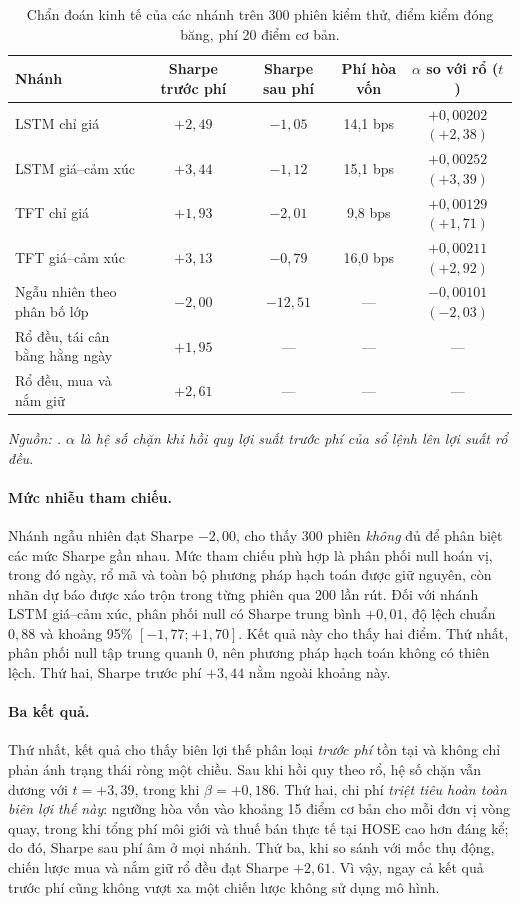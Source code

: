 \documentclass[12pt, a4paper, oneside]{report}
\begin{document}
\begin{table}[H]
  \centering
  \caption{Chẩn đoán kinh tế của các nhánh trên 300 phiên kiểm thử, điểm kiểm đóng băng, phí 20 điểm cơ bản.}
  \label{tab:kq-backtest}
  \begin{tabular}{l c c c c}
    \toprule
    Nhánh & Sharpe trước phí & Sharpe sau phí & Phí hòa vốn & $\alpha$ so với rổ ($t$) \\
    \midrule
    LSTM chỉ giá & $+2{,}49$ & $-1{,}05$ & 14,1 bps & $+0{,}00202$ $(+2{,}38)$ \\
    LSTM giá--cảm xúc & $+3{,}44$ & $-1{,}12$ & 15,1 bps & $+0{,}00252$ $(+3{,}39)$ \\
    TFT chỉ giá & $+1{,}93$ & $-2{,}01$ & 9,8 bps & $+0{,}00129$ $(+1{,}71)$ \\
    TFT giá--cảm xúc & $+3{,}13$ & $-0{,}79$ & 16,0 bps & $+0{,}00211$ $(+2{,}92)$ \\
    Ngẫu nhiên theo phân bố lớp & $-2{,}00$ & $-12{,}51$ & --- & $-0{,}00101$ $(-2{,}03)$ \\
    \midrule
    Rổ đều, tái cân bằng hằng ngày & $+1{,}95$ & --- & --- & --- \\
    Rổ đều, mua và nắm giữ & $+2{,}61$ & --- & --- & --- \\
    \bottomrule
  \end{tabular}
\noindent\textit{Nguồn: . $\alpha$ là hệ số chặn khi hồi quy lợi suất trước phí của sổ lệnh lên lợi suất rổ đều.}
\end{table}

\paragraph{Mức nhiễu tham chiếu.}
Nhánh ngẫu nhiên đạt Sharpe $-2{,}00$, cho thấy 300 phiên \emph{không} đủ để phân biệt các mức Sharpe gần nhau. Mức tham chiếu phù hợp là phân phối null hoán vị, trong đó ngày, rổ mã và toàn bộ phương pháp hạch toán được giữ nguyên, còn nhãn dự báo được xáo trộn trong từng phiên qua 200 lần rút. Đối với nhánh LSTM giá--cảm xúc, phân phối null có Sharpe trung bình $+0{,}01$, độ lệch chuẩn $0{,}88$ và khoảng 95\% $[-1{,}77; +1{,}70]$. Kết quả này cho thấy hai điểm. Thứ nhất, phân phối null tập trung quanh 0, nên phương pháp hạch toán không có thiên lệch. Thứ hai, Sharpe trước phí $+3{,}44$ nằm ngoài khoảng này.

\paragraph{Ba kết quả.}
Thứ nhất, kết quả cho thấy biên lợi thế phân loại \emph{trước phí} tồn tại và không chỉ phản ánh trạng thái ròng một chiều. Sau khi hồi quy theo rổ, hệ số chặn vẫn dương với $t = +3{,}39$, trong khi $\beta = +0{,}186$. Thứ hai, chi phí \emph{triệt tiêu hoàn toàn biên lợi thế này}: ngưỡng hòa vốn vào khoảng 15 điểm cơ bản cho mỗi đơn vị vòng quay, trong khi tổng phí môi giới và thuế bán thực tế tại HOSE cao hơn đáng kể; do đó, Sharpe sau phí âm ở mọi nhánh. Thứ ba, khi so sánh với mốc thụ động, chiến lược mua và nắm giữ rổ đều đạt Sharpe $+2{,}61$. Vì vậy, ngay cả kết quả trước phí cũng không vượt xa một chiến lược không sử dụng mô hình.
\end{document}
